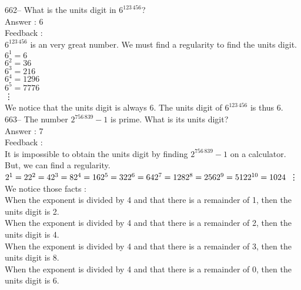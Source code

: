 \documentclass[letterpaper, 12pt]{article}
\begin{document}
662-- What is the units digit in $6^{123\,456}$?\\

Answer : 6\\

Feedback : \\
$6^{123\,456}$ is an very great number. We must find a regularity to find the units digit.\\
$6^{1}=6$\\
$6^{2}=36$\\
$6^{3}=216$\\
$6^{4}=1296$\\
$6^{5}=7776$\\
\vdots\\
We notice that the units digit is always 6. The units digit of $6^{123\,456}$ is thus 6.  \\

663--  The number $2^{756\,839}-1$ is prime. What is its units digit?\\

Answer : 7\\

Feedback : \\
It is impossible to obtain the units digit by finding $2^{756\,839}-1$ on a
calculator. But, we can find a regularity.
  \\
$2^{1}  = 2\\
2^{2}  = 4\\
2^{3}  = 8\\
2^{4} = 16\\
2^{5}  = 32\\
2^{6}  = 64\\
2^{7}  = 128\\
2^{8}= 256\\
2^{9}  = 512\\
2^{10} = 1024\\$ \vdots\\
We notice those facts :\\
When the exponent is divided by 4 and that there is a remainder of 1, then the units digit is 2.\\
When the exponent is divided by 4 and that there is a remainder of 2, then the units digit is 4.\\
When the exponent is divided by 4 and that there is a remainder of 3, then the units digit is 8.\\
When the exponent is divided by 4 and that there is a remainder of 0, then the units digit is 6.\\
\end{document}
